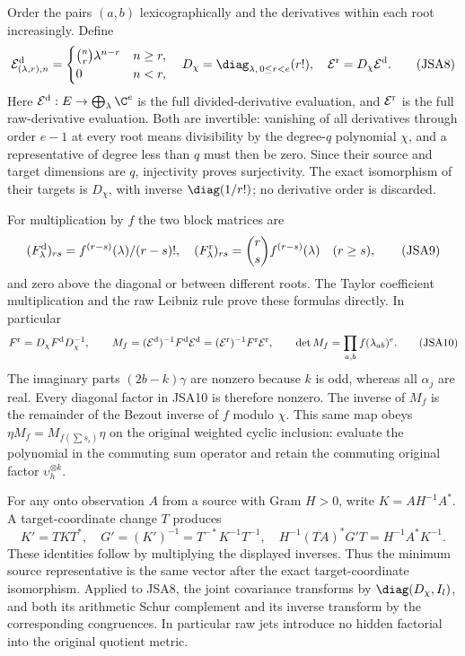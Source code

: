 Order the pairs $(a,b)$ lexicographically and the derivatives within
each root increasingly. Define
\[
 \mathcal E^{\rm d}_{(\lambda,r),n}
    =\begin{cases}\binom nr\lambda^{n-r}&n\geq r,\\0&n<r,
      \end{cases}
 \quad
 D_\chi=\diag_{\lambda,\,0\leq r<e}(r!),
 \quad\mathcal E^{\rm r}=D_\chi\mathcal E^{\rm d}.
\tag{JSA8}
\]
Here $\mathcal E^{\rm d}:E\to\bigoplus_\lambda\C^e$ is the
full divided-derivative evaluation, and $\mathcal E^{\rm r}$
is the full raw-derivative evaluation. Both are invertible:
vanishing of all derivatives through order $e-1$ at every root
means divisibility by the degree-$q$ polynomial $\chi$, and a
representative of degree less than $q$ must then be zero.
Since their source and target dimensions are $q$, injectivity
proves surjectivity. The exact isomorphism of their targets is
$D_\chi$, with inverse $\diag(1/r!)$; no derivative order is
discarded.

For multiplication by $f$ the two block matrices are
\[
 (F^{\rm d}_\lambda)_{rs}=f^{(r-s)}(\lambda)/(r-s)!,
 \quad
 (F^{\rm r}_\lambda)_{rs}=\binom rs f^{(r-s)}(\lambda)
 \quad(r\geq s),
\tag{JSA9}
\]
and zero above the diagonal or between different roots. The
Taylor coefficient multiplication and the raw Leibniz rule
prove these formulas directly. In particular
\[
 F^{\rm r}=D_\chi F^{\rm d}D_\chi^{-1},\qquad
 M_f=(\mathcal E^{\rm d})^{-1}F^{\rm d}\mathcal E^{\rm d}
    =(\mathcal E^{\rm r})^{-1}F^{\rm r}\mathcal E^{\rm r},
 \qquad \det M_f=\prod_{a,b}f(\lambda_{ab})^e.
\tag{JSA10}
\]
The imaginary parts $(2b-k)\gamma$ are nonzero because $k$ is
odd, whereas all $\alpha_j$ are real. Every diagonal factor in
JSA10 is therefore nonzero. The inverse of $M_f$ is the remainder
of the Bezout inverse of $f$ modulo $\chi$. This same map obeys
$\eta M_f=M_{f(\sum s_i)}\eta$ on the original weighted cyclic
inclusion: evaluate the polynomial in the commuting sum operator
and retain the commuting original factor $\upsilon_h^{\otimes k}$.

For any onto observation $A$ from a source with Gram $H>0$, write
$K=AH^{-1}A^*$. A target-coordinate change $T$ produces
\[
 K'=TKT^*,\quad G'=(K')^{-1}=T^{-*}K^{-1}T^{-1},\quad
 H^{-1}(TA)^*G'T=H^{-1}A^*K^{-1}.
\tag{JSA11}
\]
These identities follow by multiplying the displayed inverses.
Thus the minimum source representative is the same vector after
the exact target-coordinate isomorphism. Applied to JSA8, the
joint covariance transforms by $\diag(D_\chi,I_l)$, and both
its arithmetic Schur complement and its inverse transform by
the corresponding congruences. In particular raw jets introduce
no hidden factorial into the original quotient metric.


